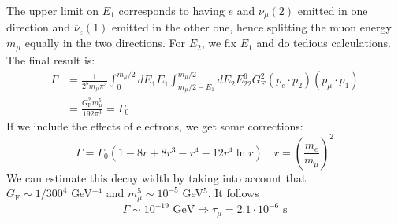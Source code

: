 \documentclass[../main.tex]{subfiles}
\begin{document}
The upper limit on $E_1$ corresponds to having $e$ and $\nu_\mu (2)$ emitted in one direction and $\overline{\nu}_e (1)$ emitted in the other one, hence splitting the muon energy $m_\mu$ equally in the two directions. For $E_2$, we fix $E_1$ and do tedious calculations. The final result is:
\begin{align*}
\Gamma&=\frac{1}{2^5m_\mu\pi^3}\int_0^{m_\mu/2}dE_1E_1\int_{m_\mu/2-E_1}^{m_\mu/2}dE_2E_22^6G_{\text{F}}^2(p_e\cdot p_2)(p_\mu\cdot p_1)\\
&=\frac{G_{\text{F}}^2m_\mu^5}{192\pi^3}=\Gamma_0
\end{align*}
If we include the effects of electrons, we get some corrections:
\[
\Gamma=\Gamma_0(1-8r+8r^3-r^4-12r^4\ln r) \quad r=\left(\frac{m_e}{m_\mu}\right)^2
\]
We can estimate this decay width by taking into account that\\
$G_{\text{F}}\sim1/300^4$ GeV$^{-4}$ and $m_\mu^5\sim10^{-5}$ GeV$^5$. It follows
\[
\Gamma\sim10^{-19}\text{ GeV}\Rightarrow\tau_\mu=2.1\cdot10^{-6}\text{ s}
\]
\end{document}
